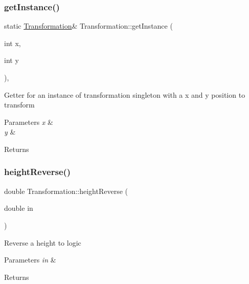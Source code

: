 \subsubsection{\texorpdfstring{get\+Instance()}{getInstance()}}
{\footnotesize\ttfamily static \hyperlink{classTransformation}{Transformation}\& Transformation\+::get\+Instance (\begin{DoxyParamCaption}\item[{int}]{x,  }\item[{int}]{y }\end{DoxyParamCaption})\hspace{0.3cm}{\ttfamily [inline]}, {\ttfamily [static]}}

Getter for an instance of transformation singleton with a x and y position to transform 
\begin{DoxyParams}{Parameters}
{\em x} & \\
\hline
{\em y} & \\
\hline
\end{DoxyParams}
\begin{DoxyReturn}{Returns}

\end{DoxyReturn}
\mbox{\label{classTransformation_a5f95bb2fe7c49c4b1fd73cb27e1e7d07}} 
\subsubsection{\texorpdfstring{height\+Reverse()}{heightReverse()}}
{\footnotesize\ttfamily double Transformation\+::height\+Reverse (\begin{DoxyParamCaption}\item[{double}]{in }\end{DoxyParamCaption})}

Reverse a height to logic 
\begin{DoxyParams}{Parameters}
{\em in} & \\
\hline
\end{DoxyParams}
\begin{DoxyReturn}{Returns}

\end{DoxyReturn}
\mbox{\label{classTransformation_a821e71423cd9e8e606ec3487d634f73f}} 
